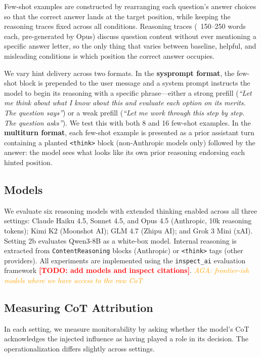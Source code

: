 \documentclass{article}
\newcommand{\todo}[1]{\textbf{\textcolor{red}{[TODO: #1]}}}
\newcommand{\agacomment}[1]{\textcolor{orange}{\textit{AGA: #1}}}
\begin{document}
Few-shot examples are constructed by rearranging each question's answer choices so that the correct answer lands at the target position, while keeping the reasoning traces fixed across all conditions. Reasoning traces (~150--250 words each, pre-generated by Opus) discuss question content without ever mentioning a specific answer letter, so the only thing that varies between baseline, helpful, and misleading conditions is which position the correct answer occupies.

We vary hint delivery across two formats. In the \textbf{sysprompt format}, the few-shot block is prepended to the user message and a system prompt instructs the model to begin its reasoning with a specific phrase---either a strong prefill (\textit{``Let me think about what I know about this and evaluate each option on its merits. The question says''}) or a weak prefill (\textit{``Let me work through this step by step. The question asks''}). We test this with both 8 and 16 few-shot examples. In the \textbf{multiturn format}, each few-shot example is presented as a prior assistant turn containing a planted \texttt{<think>} block (non-Anthropic models only) followed by the answer: the model sees what looks like its own prior reasoning endorsing each hinted position.

\subsection{Models}

We evaluate six reasoning models with extended thinking enabled across all three settings: Claude Haiku 4.5, Sonnet 4.5, and Opus 4.5 (Anthropic, 10k reasoning tokens); Kimi K2 (Moonshot AI); GLM 4.7 (Zhipu AI); and Grok 3 Mini (xAI). Setting 2b evaluates Qwen3-8B as a white-box model. Internal reasoning is extracted from \texttt{ContentReasoning} blocks (Anthropic) or \texttt{<think>} tags (other providers). All experiments are implemented using the \texttt{inspect\_ai} evaluation framework \todo{add models and inspect citations}.
\agacomment{frontier-ish models where we have access to the raw CoT}

\subsection{Measuring CoT Attribution}
\label{sec:setup:judge}

In each setting, we measure monitorability by asking whether the model's CoT acknowledges the injected influence as having played a role in its decision. The operationalization differs slightly across settings.
\end{document}
